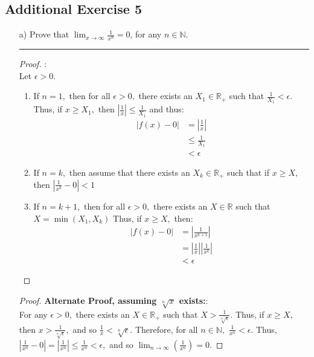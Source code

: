 \documentclass[openany, amssymb, psamsfonts]{amsart}
\newcommand{\bbN}{\mathbb{N}}
\newcommand{\bbR}{\mathbb{R}}
\theoremstyle{definition}
\numberwithin{equation}{section}
\begin{document}
\begin{enumerate}
\section*{Additional Exercise 5}
	\begin{enumerate}
		\item[a)] Prove that $\displaystyle \lim_{x\to \infty}\frac{1}{x^n}=0$, for any $n\in\bbN$. 
\vspace{4pt}     \hrule   \vspace{4pt} \begin{proof}:\\
Let $\epsilon>0.$
\begin{enumerate}
    \item If $n=1,$ then for all $\epsilon>0,$ there exists an $X_1\in \bbR_+$ such that $\frac{1}{X_1}< \epsilon.$ Thus, if $x\geq X_1,$ then $|\frac{1}{x}|\leq \frac{1}{X_1}$ and thus:
    \begin{align*}
        |f(x) - 0| &= |\frac{1}{x}|\\
        &\leq \frac{1}{X_1}\\
        &< \epsilon
    \end{align*}
    \item If $n=k,$ then assume that there exists an $X_k\in \bbR_+$ such that if $x\geq X,$ then $|\frac{1}{x^k}- 0|< 1$  
    \item If $n = k+1,$ then for all $\epsilon>0,$ there exists an $X \in \bbR$ such that $X = \min(X_1,X_k)$ Thus, if $x\geq X,$ then:
    \begin{align*}
        |f(x) - 0| &= |\frac{1}{x^{k+1}}|\\
        &= |\frac{1}{x}||\frac{1}{x^k}|\\
        &<\epsilon
    \end{align*}
\end{enumerate}
\end{proof}\begin{proof}\textbf{Alternate Proof, assuming $\sqrt[n]{x}$ exists:}:\\
For any $\epsilon>0,$ there exists an $X\in \bbR_+$ such that $X> \frac{1}{\sqrt[n]{\epsilon}}.$ Thus, if $x\geq X,$ then $x> \frac{1}{\sqrt[n]{\epsilon}},$ and so $\frac{1}{x}< \sqrt[n]{\epsilon}.$ Therefore, for all $n \in \bbN,$ $\frac{1}{x^n}< \epsilon.$ Thus, $|\frac{1}{x^n} - 0| = |\frac{1}{x^n}|\leq \frac{1}{x^n}< \epsilon,$ and so $\displaystyle\lim_{n\to \infty}(\frac{1}{x^n}) = 0.$
\end{proof}



\end{enumerate}
\end{enumerate}
\end{document}
